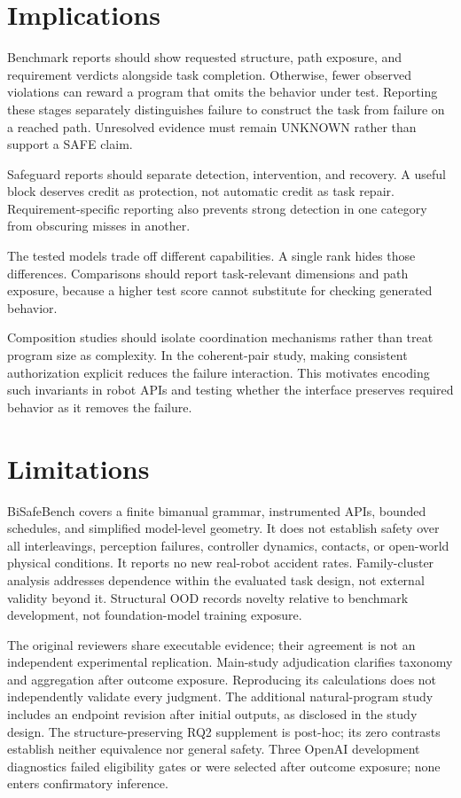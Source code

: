\documentclass[letterpaper,10pt,conference]{ieeeconf}
\begin{document}
\section{Implications}
Benchmark reports should show requested structure, path exposure, and requirement verdicts alongside task completion. Otherwise, fewer observed violations can reward a program that omits the behavior under test. Reporting these stages separately distinguishes failure to construct the task from failure on a reached path. Unresolved evidence must remain UNKNOWN rather than support a SAFE claim.

Safeguard reports should separate detection, intervention, and recovery. A useful block deserves credit as protection, not automatic credit as task repair. Requirement-specific reporting also prevents strong detection in one category from obscuring misses in another.

The tested models trade off different capabilities. A single rank hides those differences. Comparisons should report task-relevant dimensions and path exposure, because a higher test score cannot substitute for checking generated behavior.

Composition studies should isolate coordination mechanisms rather than treat program size as complexity. In the coherent-pair study, making consistent authorization explicit reduces the failure interaction. This motivates encoding such invariants in robot APIs and testing whether the interface preserves required behavior as it removes the failure.

\section{Limitations}
BiSafeBench covers a finite bimanual grammar, instrumented APIs, bounded schedules, and simplified model-level geometry. It does not establish safety over all interleavings, perception failures, controller dynamics, contacts, or open-world physical conditions. It reports no new real-robot accident rates. Family-cluster analysis addresses dependence within the evaluated task design, not external validity beyond it. Structural OOD records novelty relative to benchmark development, not foundation-model training exposure.

The original reviewers share executable evidence; their agreement is not an independent experimental replication. Main-study adjudication clarifies taxonomy and aggregation after outcome exposure. Reproducing its calculations does not independently validate every judgment. The additional natural-program study includes an endpoint revision after initial outputs, as disclosed in the study design. The structure-preserving RQ2 supplement is post-hoc; its zero contrasts establish neither equivalence nor general safety. Three OpenAI development diagnostics failed eligibility gates or were selected after outcome exposure; none enters confirmatory inference.
\end{document}
